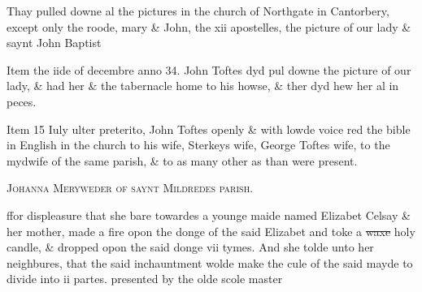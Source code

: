 \documentclass[12pt, a4paper]{book}
\begin{document}
				\marginpar[\vspace{0.5cm}{\textcolor{Gray}{images}}]{}
			
	
		\ifthenelse{\isodd{\thepage}}
		{\reversemarginpar}
		{\normalmarginpar}
		Thay pulled downe al the pictures in the church of Northgate
		in Cantorbery, except only the roode, mary \& John, the
 xii apostelles, the picture of our lady \& saynt John Baptist
	
		\ifthenelse{\isodd{\thepage}}
		{\reversemarginpar}
		{\normalmarginpar}
		Item the iide of decembre anno 34. John Toftes dyd pul downe
 the picture of our lady, \& had her \& the tabernacle home
 to his howse, \& ther dyd hew her al in peces.
	
		\ifthenelse{\isodd{\thepage}}
		{\reversemarginpar}
		{\normalmarginpar}
		Item 15 Iuly ulter preterito, John Toftes openly \& with lowde
 voice red the bible in English in the church to his wife,
		Sterkeys wife, George Toftes wife, to the mydwife of the
 same parish, \& to as many other as than were present.
 

            
            
               
				\begin{center} \begin{large} {\scshape Johanna Meryweder of saynt Mildredes parish.} \end{large} \end{center}
			

 
 	
				\marginpar[\vspace{0.5cm}{\textcolor{Gray}{superstition}}]{}
			
 	
				\marginpar[\vspace{0.5cm}{\textcolor{Gray}{n}}]{}
			
 	
				\marginpar[\vspace{0.5cm}{\textcolor{Gray}{she dyd ytt not but sayd she wold do ytt}}]{}
			
 	
		\ifthenelse{\isodd{\thepage}}
		{\reversemarginpar}
		{\normalmarginpar}
		ffor displeasure that she bare towardes a younge maide named
			 Elizabet Celsay \&
 	her mother, made a fire opon the donge of the said Elizabet
 		and toke a \sout{waxe} holy
			 candle, \& dropped opon the said donge vii
 tymes. And she tolde unto her neighbures, that the said
 inchauntment wolde make the cule of the said mayde to
 divide into ii partes. presented by the olde scole master
 
\end{document}
